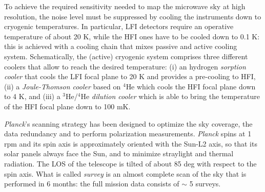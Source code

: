 %
To achieve the required sensitivity needed to map the microwave sky at high resolution, the noise level must be suppressed by cooling the instruments down to cryogenic temperatures. In particular, LFI detectors require an operative temperature of about 20 K, while the HFI ones have to be cooled down to 0.1 K: this is achieved with a cooling chain that mixes passive and active cooling system. Schematically, the (active) cryogenic system comprises  three different coolers that allow to reach the desired temperature: (i) an hydrogen \emph{sorption cooler} that cools the LFI focal plane to 20 K and provides a pre-cooling to HFI, (ii) a \emph{Joule-Thomson cooler} based on ${}^4$He which cools the HFI focal plane down to 4 K, and (iii) a ${}^3$He/${}^4$He \emph{dilution cooler} which is able to bring the temperature of the HFI focal plane down to 100 mK. 

\textit{Planck}'s scanning strategy has been designed to optimize the sky coverage, the data redundancy and  to perform polarization measurements. \textit{Planck} spins at 1 rpm and its spin axis is approximately oriented with the Sun-L2 axis, so that its solar panels always face the Sun, and to minimize straylight and thermal radiation. The \gls{LOS} of the telescope is tilted of about 85 deg with respect to the spin axis. What is called \emph{survey} is an almost complete scan of the sky that is performed in 6 months: the full mission data consists of $\sim$ 5 surveys.

